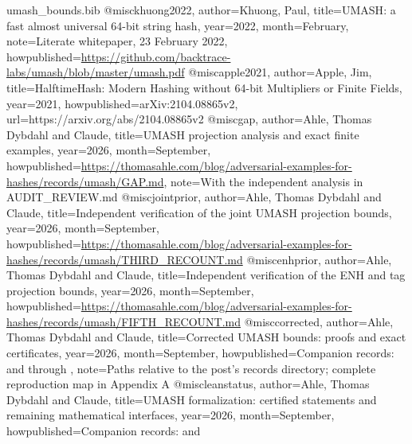 \begin{filecontents*}[overwrite]{umash_bounds.bib}
@misc{khuong2022,
 author={Khuong, Paul},
 title={{UMASH}: a fast almost universal 64-bit string hash},
 year={2022}, month={February},
 note={Literate whitepaper, 23 February 2022},
 howpublished={\url{https://github.com/backtrace-labs/umash/blob/master/umash.pdf}}}
@misc{apple2021,
 author={Apple, Jim},
 title={{HalftimeHash}: Modern Hashing without 64-bit Multipliers or Finite Fields},
 year={2021}, howpublished={arXiv:2104.08865v2},
 url={https://arxiv.org/abs/2104.08865v2}}
@misc{gap,
 author={Ahle, Thomas Dybdahl and {Claude}},
 title={{UMASH} projection analysis and exact finite examples},
 year={2026}, month={September},
 howpublished={\url{https://thomasahle.com/blog/adversarial-examples-for-hashes/records/umash/GAP.md}},
 note={With the independent analysis in AUDIT\_REVIEW.md}}
@misc{jointprior,
 author={Ahle, Thomas Dybdahl and {Claude}},
 title={Independent verification of the joint {UMASH} projection bounds},
 year={2026}, month={September},
 howpublished={\url{https://thomasahle.com/blog/adversarial-examples-for-hashes/records/umash/THIRD_RECOUNT.md}}}
@misc{enhprior,
 author={Ahle, Thomas Dybdahl and {Claude}},
 title={Independent verification of the {ENH} and tag projection bounds},
 year={2026}, month={September},
 howpublished={\url{https://thomasahle.com/blog/adversarial-examples-for-hashes/records/umash/FIFTH_RECOUNT.md}}}
@misc{corrected,
 author={Ahle, Thomas Dybdahl and {Claude}},
 title={Corrected {UMASH} bounds: proofs and exact certificates},
 year={2026}, month={September},
 howpublished={Companion records:  and  through },
 note={Paths relative to the post's records directory; complete reproduction map in Appendix A}}
@misc{leanstatus,
 author={Ahle, Thomas Dybdahl and {Claude}},
 title={{UMASH} formalization: certified statements and remaining mathematical interfaces},
 year={2026}, month={September},
 howpublished={Companion records:  and }}
\end{filecontents*}
\documentclass[10pt,a4paper]{article}
\usepackage[T1]{fontenc}
\usepackage[utf8]{inputenc}
\usepackage{lmodern,amsmath,amssymb,amsthm,mathtools,booktabs,array,longtable}
\usepackage[margin=23mm,headheight=14pt]{geometry}
\usepackage{microtype,xcolor,url,fancyhdr}
\usepackage[colorlinks=true,allcolors=blue!40!black,breaklinks=true]{hyperref}

